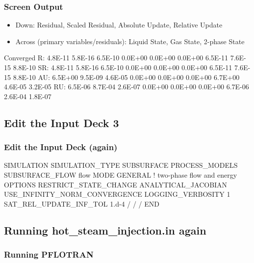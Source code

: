 \documentclass{beamer}
\newcommand\bluecomment[1]{{{\color{blue} #1}}}
\begin{document}
\begin{frame}[fragile]\frametitle{Screen Output}

\begin{itemize}
\item \bluecomment{Down:} Residual, Scaled Residual, Absolute Update, Relative Update
\item \bluecomment{Across (primary variables/residuals):} Liquid State, Gas State, 2-phase State 
\end{itemize}

\begin{semiverbatim}
\scriptsize
Converged
     R: 4.8E-11 5.8E-16 6.5E-10 0.0E+00 0.0E+00 0.0E+00 6.5E-11 7.6E-15 8.8E-10
    SR: 4.8E-11 5.8E-16 6.5E-10 0.0E+00 0.0E+00 0.0E+00 6.5E-11 7.6E-15 8.8E-10
    AU: 6.5E+00 9.5E-09 4.6E-05 0.0E+00 0.0E+00 0.0E+00 6.7E+00 4.6E-05 3.2E-05
    RU: 6.5E-06 8.7E-04 2.6E-07 0.0E+00 0.0E+00 0.0E+00 6.7E-06 2.6E-04 1.8E-07

\end{semiverbatim}

\end{frame}
\subsection{Edit the Input Deck 3}

\begin{frame}[fragile]\frametitle{Edit the Input Deck (again)}

\begin{semiverbatim}

SIMULATION
  SIMULATION_TYPE SUBSURFACE
  PROCESS_MODELS
    SUBSURFACE_FLOW flow
      MODE GENERAL ! two-phase flow and energy
      OPTIONS
        RESTRICT_STATE_CHANGE
        ANALYTICAL_JACOBIAN
        USE_INFINITY_NORM_CONVERGENCE
        LOGGING_VERBOSITY 1
        SAT_REL_UPDATE_INF_TOL 1.d-4
      / 
    / 
  / 
END 

\end{semiverbatim}

\end{frame}

\subsection{Running hot_steam_injection.in again}

\begin{frame}[fragile]\frametitle{Running PFLOTRAN}


\end{frame}
\end{document}
